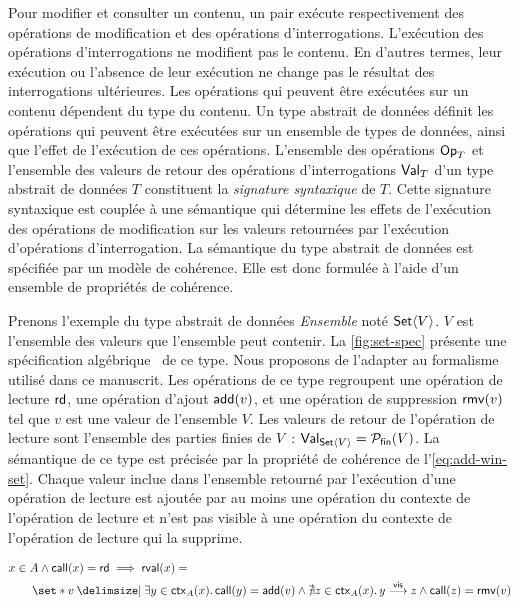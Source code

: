 Pour modifier et consulter un contenu, un pair exécute respectivement des opérations de modification et des opérations d'interrogations.
L'exécution des opérations d'interrogations ne modifient pas le contenu.
En d'autres termes, leur exécution ou l'absence de leur exécution ne change pas le résultat des interrogations ultérieures.
Les opérations qui peuvent être exécutées sur un contenu dépendent du type du contenu.
Un type abstrait de données définit les opérations qui peuvent être exécutées sur un ensemble de types de données, ainsi que l'effet de l'exécution de ces opérations.
L'ensemble des opérations $\trm{Op}_T$ et l'ensemble des valeurs de retour des opérations d'interrogations $\trm{Val}_T$ d'un type abstrait de données $T$ constituent la \emph{signature syntaxique} de $T$.
Cette signature syntaxique est couplée à une sémantique qui détermine les effets de l'exécution des opérations de modification sur les valeurs retournées par l'exécution d'opérations d'interrogation.
La sémantique du type abstrait de données est spécifiée par un modèle de cohérence.
Elle est donc formulée à l'aide d'un ensemble de propriétés de cohérence.

Prenons l'exemple du type abstrait de données \emph{Ensemble} noté $\trm{Set}\tuple*{V}$.
$V$ est l'ensemble des valeurs que l'ensemble peut contenir.
La \autoref{fig:set-spec} présente une spécification algébrique~\autocite{wirsing1990_algebraicspec} de ce type.
Nous proposons de l'adapter au formalisme utilisé dans ce manuscrit.
Les opérations de ce type regroupent une opération de lecture $\trm{rd}$, une opération d'ajout $\trm{add}(v)$, et une opération de suppression $\trm{rmv}(v)$ tel que $v$ est une valeur de l'ensemble $V$.
Les valeurs de retour de l'opération de lecture sont l'ensemble des parties finies de $V$~: $\trm{Val}_{\trm{Set}\tuple*{V}} = \powerfset{V}$.
La sémantique de ce type est précisée par la propriété de cohérence de l'\autoref{eq:add-win-set}.
Chaque valeur inclue dans l'ensemble retourné par l'exécution d'une opération de lecture est ajoutée par au moins une opération du contexte de l'opération de lecture et n'est pas visible à une opération du contexte de l'opération de lecture qui la supprime.

\begin{equation}\begin{split}\label{eq:add-win-set}
\MoveEqLeft x \in A \land \trm{call}(x) = \trm{rd} \implies \trm{rval}(x) =\\
    &\set*{v \given \exists y \in \trm{ctx}_A(x) \qsep \trm{call}(y) = \trm{add}(v) \land \nexists z \in \trm{ctx}_A(x) \qsep y \vis z \land \trm{call}(z) = \trm{rmv}(v)}
\end{split}\end{equation}

